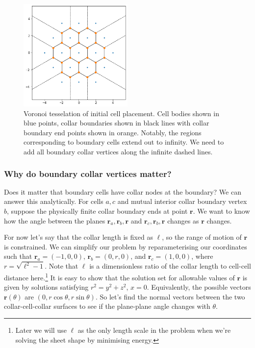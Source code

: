 \begin{figure}[htbp]
    \centering
    \includegraphics[width=0.5\textwidth]{voronoi.png}
    \caption{Voronoi tesselation of initial cell placement. Cell bodies shown in blue points, collar boundaries shown in black lines with collar boundary end points shown in orange. Notably, the regions corresponding to boundary cells extend out to infinity. We need to add all boundary collar vertices along the infinite dashed lines.}
    \label{fig:voronoi}
\end{figure}

\subsubsection{Why do boundary collar vertices matter?}

Does it matter that boundary cells have collar nodes at the boundary? We can answer this analytically. For cells $a, c$ and mutual interior collar boundary vertex $b$, suppose the physically finite collar boundary ends at point $\bm{r}$. We want to know how the angle between the planes $\bm{r}_a, \bm{r}_b, \bm{r}$ and $\bm{r}_c, \bm{r}_b, \bm{r}$ changes as $\bm{r}$ changes. 

For now let's say that the collar length is fixed as $\ell$, so the range of motion of $\bm{r}$ is constrained. We can simplify our problem by reparameterising our coordinates such that $\bm{r}_a = (-1, 0, 0)$, $\bm{r}_b = (0, r, 0)$, and $\bm{r}_c = (1, 0, 0)$, where $r = \sqrt{\ell^2 - 1}$. Note that $\ell$ is a dimensionless ratio of the collar length to cell-cell distance here.\footnote{Later we will use $\ell$ as the only length scale in the problem when we're solving the sheet shape by minimising energy.} It is easy to show that the solution set for allowable values of $\bm{r}$ is given by solutions satisfying $r^2 = y^2 + z^2$, $x=0$. Equivalently, the possible vectors $\bm{r}(\theta)$ are $(0, r\cos\theta, r\sin\theta)$. So let's find the normal vectors between the two collar-cell-collar surfaces to see if the plane-plane angle changes with $\theta$. 

